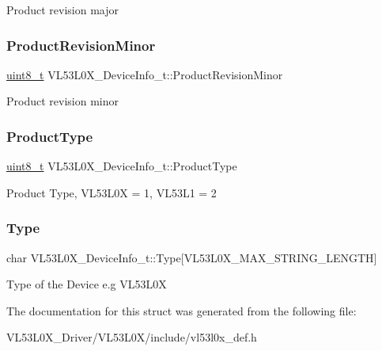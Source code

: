 Product revision major \mbox{\label{structVL53L0X__DeviceInfo__t_a01b06c72fa7c5e21a1ae59fbd4dd5671}} 
\subsubsection{\texorpdfstring{Product\+Revision\+Minor}{ProductRevisionMinor}}
{\footnotesize\ttfamily \hyperlink{vl53l0x__types_8h_aba7bc1797add20fe3efdf37ced1182c5}{uint8\+\_\+t} V\+L53\+L0\+X\+\_\+\+Device\+Info\+\_\+t\+::\+Product\+Revision\+Minor}

Product revision minor \mbox{\label{structVL53L0X__DeviceInfo__t_ad922e4cf248a21df3afc476e40b89955}} 
\subsubsection{\texorpdfstring{Product\+Type}{ProductType}}
{\footnotesize\ttfamily \hyperlink{vl53l0x__types_8h_aba7bc1797add20fe3efdf37ced1182c5}{uint8\+\_\+t} V\+L53\+L0\+X\+\_\+\+Device\+Info\+\_\+t\+::\+Product\+Type}

Product Type, V\+L53\+L0X = 1, V\+L53\+L1 = 2 \mbox{\label{structVL53L0X__DeviceInfo__t_a99a008cd6140008b73d4935b91590798}} 
\subsubsection{\texorpdfstring{Type}{Type}}
{\footnotesize\ttfamily char V\+L53\+L0\+X\+\_\+\+Device\+Info\+\_\+t\+::\+Type\mbox{[}V\+L53\+L0\+X\+\_\+\+M\+A\+X\+\_\+\+S\+T\+R\+I\+N\+G\+\_\+\+L\+E\+N\+G\+TH\mbox{]}}

Type of the Device e.\+g V\+L53\+L0X 

The documentation for this struct was generated from the following file\+:\begin{DoxyCompactItemize}
\item 
V\+L53\+L0\+X\+\_\+\+Driver/\+V\+L53\+L0\+X/include/vl53l0x\+\_\+def.\+h\end{DoxyCompactItemize}
